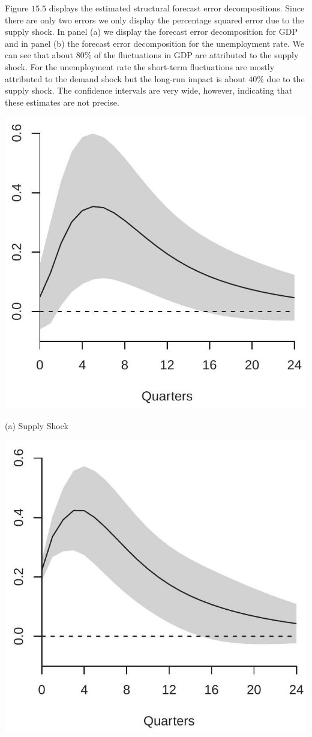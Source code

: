 \documentclass[10pt]{article}
\begin{document}
Figure $15.5$ displays the estimated structural forecast error decompositions. Since there are only two errors we only display the percentage squared error due to the supply shock. In panel (a) we display the forecast error decomposition for GDP and in panel (b) the forecast error decomposition for the unemployment rate. We can see that about $80 \%$ of the fluctuations in GDP are attributed to the supply shock. For the unemployment rate the short-term fluctuations are mostly attributed to the demand shock but the long-run impact is about $40 \%$ due to the supply shock. The confidence intervals are very wide, however, indicating that these estimates are not precise.

\includegraphics[max width=\textwidth]{2022_10_23_7c0e31a459390f548ae3g-30}

(a) Supply Shock

\includegraphics[max width=\textwidth]{2022_10_23_7c0e31a459390f548ae3g-30(1)}
\end{document}
